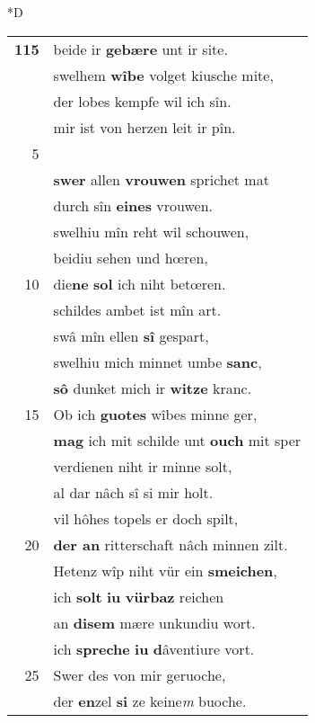 \documentclass[8pt,a4paper,notitlepage]{article}
\begin{document}
\begin{table}[ht]
\begin{minipage}[t]{0.5\linewidth}
\small
\begin{center}*D
\end{center}
\begin{tabular}{rl}
\textbf{115} & beide ir \textbf{gebære} unt ir site.\\ 
 & swelhem \textbf{wîbe} volget kiusche mite,\\ 
 & der lobes kempfe wil ich sîn.\\ 
 & mir ist von herzen leit ir pîn.\\ 
5 & \textbf{\begin{large}E\end{large}in} lop hinket \textbf{ame} spat,\\ 
 & \textbf{swer} allen \textbf{vrouwen} sprichet mat\\ 
 & durch sîn \textbf{eines} vrouwen.\\ 
 & swelhiu mîn reht wil schouwen,\\ 
 & beidiu sehen und hœren,\\ 
10 & die\textbf{ne} \textbf{sol} ich niht betœren.\\ 
 & schildes ambet ist mîn art.\\ 
 & swâ mîn ellen \textbf{sî} gespart,\\ 
 & swelhiu mich minnet umbe \textbf{sanc},\\ 
 & \textbf{sô} dunket mich ir \textbf{witze} kranc.\\ 
15 & Ob ich \textbf{guotes} wîbes minne ger,\\ 
 & \textbf{mag} ich mit schilde unt \textbf{ouch} mit sper\\ 
 & verdienen niht ir minne solt,\\ 
 & al dar nâch sî si mir holt.\\ 
 & vil hôhes topels er doch spilt,\\ 
20 & \textbf{der an} ritterschaft nâch minnen zilt.\\ 
 & Hetenz wîp niht vür ein \textbf{smeichen},\\ 
 & ich \textbf{solt} \textbf{iu} \textbf{vürbaz} reichen\\ 
 & an \textbf{disem} mære unkundiu wort.\\ 
 & ich \textbf{spreche} \textbf{iu} \textbf{d}âventiure vort.\\ 
25 & Swer des von mir geruoche,\\ 
 & der \textbf{en}zel \textbf{si} ze keine\textit{m} buoche.\\ 

\end{tabular}
\end{minipage}
\end{table}
\end{document}
